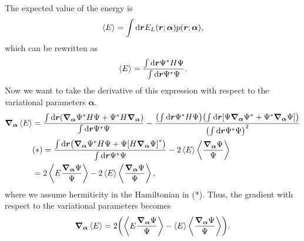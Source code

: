 The expected value of the energy is 
\begin{equation}
    \expval{E} = \int\mathrm{d}\bm{r}E_L(\bm{r};\bm{\alpha})p(\bm{r};\bm{\alpha}),
\end{equation}
which can be rewritten as 
\begin{equation}
    \expval{E} = \frac{\int\mathrm{d}\bm{r}\Psi^*H\Psi}{\int\mathrm{d}\bm{r}\Psi^*\Psi}.
\end{equation}
Now we want to take the derivative of this expression with respect to the variational parameters $\bm{\alpha}$. 
\begin{align*}
    \grad_{\bm{\alpha}}\expval{E} &= \frac{\int\mathrm{d}\bm{r}\qty(\grad_{\bm{\alpha}}\Psi^*H\Psi + \Psi^*H\grad_{\bm{\alpha}})}{\int\mathrm{d}\bm{r}\Psi^*\Psi} - \frac{\qty(\int\mathrm{d}\bm{r}\Psi^*H\Psi)\qty(\int\mathrm{d}\bm{r}\qty[\Psi\grad_{\bm{\alpha}}\Psi^* + \Psi^*\grad_{\bm{\alpha}}\Psi])}{\qty(\int\mathrm{d}\bm{r}\Psi^*\Psi)^2} \\
    &(*)= \frac{\int\mathrm{d}\bm{r}\qty(\grad_{\bm{\alpha}}\Psi^*H\Psi + \Psi\qty[H\grad_{\bm{\alpha}}\Psi]^*)}{\int\mathrm{d}\bm{r}\Psi^*\Psi} - 2\expval{E}\expval{\frac{\grad_{\bm{\alpha}}\Psi}{\Psi}} \\
    &= 2\expval{E\frac{\grad_{\bm{\alpha}}\Psi}{\Psi}} - 2\expval{E}\expval{\frac{\grad_{\bm{\alpha}}\Psi}{\Psi}},
\end{align*}
where we assume hermiticity in the Hamiltonian in (*). Thus, the gradient with respect to the variational parameters becomes 
\begin{equation}
    \grad_{\bm{\alpha}}\expval{E} = 2\qty(\expval{E\frac{\grad_{\bm{\alpha}}\Psi}{\Psi}}-\expval{E}\expval{\frac{\grad_{\bm{\alpha}}\Psi}{\Psi}}).
\end{equation}